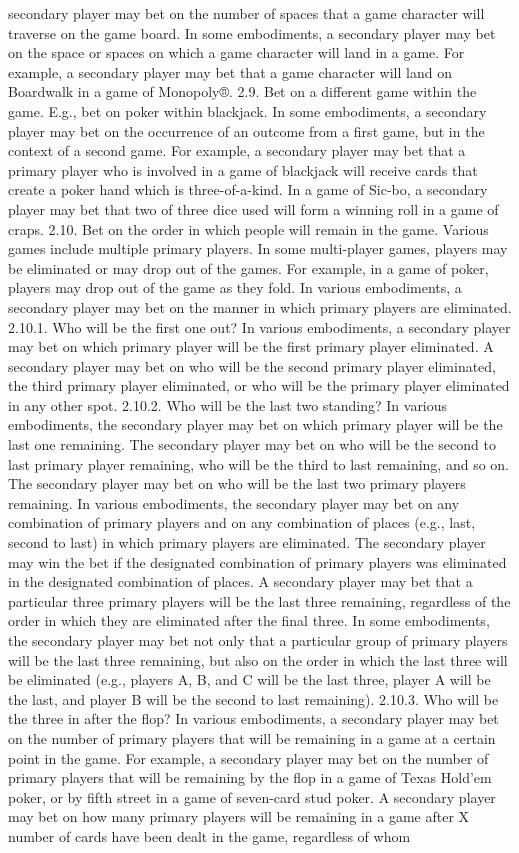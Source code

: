 \documentclass[11pt,a4paper]{article}
\begin{document}
secondary player may bet on the number of spaces that a game character will traverse on the game board. In some embodiments, a secondary player may bet on the space or spaces on which a game character will land in a game. For example, a secondary player may bet that a game character will land on Boardwalk in a game of Monopoly®. 2.9. Bet on a different game within the game. E.g., bet on poker within blackjack. In some embodiments, a secondary player may bet on the occurrence of an outcome from a first game, but in the context of a second game. For example, a secondary player may bet that a primary player who is involved in a game of blackjack will receive cards that create a poker hand which is three-of-a-kind. In a game of Sic-bo, a secondary player may bet that two of three dice used will form a winning roll in a game of craps. 2.10. Bet on the order in which people will remain in the game. Various games include multiple primary players. In some multi-player games, players may be eliminated or may drop out of the games. For example, in a game of poker, players may drop out of the game as they fold. In various embodiments, a secondary player may bet on the manner in which primary players are eliminated. 2.10.1. Who will be the first one out? In various embodiments, a secondary player may bet on which primary player will be the first primary player eliminated. A secondary player may bet on who will be the second primary player eliminated, the third primary player eliminated, or who will be the primary player eliminated in any other spot. 2.10.2. Who will be the last two standing? In various embodiments, the secondary player may bet on which primary player will be the last one remaining. The secondary player may bet on who will be the second to last primary player remaining, who will be the third to last remaining, and so on. The secondary player may bet on who will be the last two primary players remaining. In various embodiments, the secondary player may bet on any combination of primary players and on any combination of places (e.g., last, second to last) in which primary players are eliminated. The secondary player may win the bet if the designated combination of primary players was eliminated in the designated combination of places. A secondary player may bet that a particular three primary players will be the last three remaining, regardless of the order in which they are eliminated after the final three. In some embodiments, the secondary player may bet not only that a particular group of primary players will be the last three remaining, but also on the order in which the last three will be eliminated (e.g., players A, B, and C will be the last three, player A will be the last, and player B will be the second to last remaining). 2.10.3. Who will be the three in after the flop? In various embodiments, a secondary player may bet on the number of primary players that will be remaining in a game at a certain point in the game. For example, a secondary player may bet on the number of primary players that will be remaining by the flop in a game of Texas Hold'em poker, or by fifth street in a game of seven-card stud poker. A secondary player may bet on how many primary players will be remaining in a game after X number of cards have been dealt in the game, regardless of whom 
\end{document}
